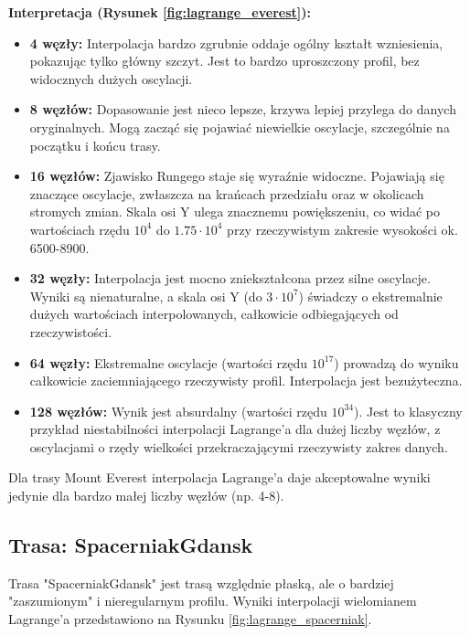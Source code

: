 \documentclass[11pt,a4paper]{article}
\begin{document}
\textbf{Interpretacja (Rysunek \ref{fig:lagrange_everest}):} 
\begin{itemize}
    \item \textbf{4 węzły:} Interpolacja bardzo zgrubnie oddaje ogólny kształt wzniesienia, pokazując tylko główny szczyt. Jest to bardzo uproszczony profil, bez widocznych dużych oscylacji.
    \item \textbf{8 węzłów:} Dopasowanie jest nieco lepsze, krzywa lepiej przylega do danych oryginalnych. Mogą zacząć się pojawiać niewielkie oscylacje, szczególnie na początku i końcu trasy.
    \item \textbf{16 węzłów:} Zjawisko Rungego staje się wyraźnie widoczne. Pojawiają się znaczące oscylacje, zwłaszcza na krańcach przedziału oraz w okolicach stromych zmian. Skala osi Y ulega znacznemu powiększeniu, co widać po wartościach rzędu $10^4$ do $1.75 \cdot 10^4$ przy rzeczywistym zakresie wysokości ok. 6500-8900.
    \item \textbf{32 węzły:} Interpolacja jest mocno zniekształcona przez silne oscylacje. Wyniki są nienaturalne, a skala osi Y (do $3 \cdot 10^7$) świadczy o ekstremalnie dużych wartościach interpolowanych, całkowicie odbiegających od rzeczywistości.
    \item \textbf{64 węzły:} Ekstremalne oscylacje (wartości rzędu $10^{17}$) prowadzą do wyniku całkowicie zaciemniającego rzeczywisty profil. Interpolacja jest bezużyteczna.
    \item \textbf{128 węzłów:} Wynik jest absurdalny (wartości rzędu $10^{34}$). Jest to klasyczny przykład niestabilności interpolacji Lagrange'a dla dużej liczby węzłów, z oscylacjami o rzędy wielkości przekraczającymi rzeczywisty zakres danych.
\end{itemize}
Dla trasy Mount Everest interpolacja Lagrange'a daje akceptowalne wyniki jedynie dla bardzo małej liczby węzłów (np. 4-8).

\subsection{Trasa: SpacerniakGdansk}
Trasa "SpacerniakGdansk" jest trasą względnie płaską, ale o bardziej "zaszumionym" i nieregularnym profilu. Wyniki interpolacji wielomianem Lagrange'a przedstawiono na Rysunku \ref{fig:lagrange_spacerniak}.
\end{document}
